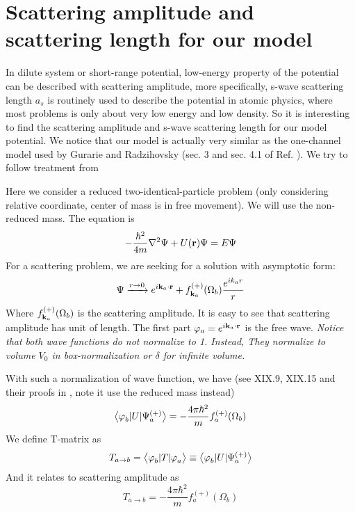 \section{Scattering amplitude and scattering length for our model \label{sec:scatter}}
In dilute system or short-range potential, low-energy property of the potential can be described with scattering amplitude\cite{Pethick,Fetter}, more specifically, s-wave scattering length $a_{s}$ is routinely used to describe the potential in atomic physics, where most problems is only about very low energy and low density.  So it is interesting to find the scattering amplitude and s-wave scattering length for our model potential. We notice that our model is actually very similar as the one-channel model used by Gurarie and Radzihovsky (sec. 3 and sec. 4.1 of Ref. \cite{GurarieNarrow}).  We try to follow treatment from \cite{Messiah,GurarieNarrow}

Here we consider a reduced two-identical-particle problem (only considering relative coordinate, center of mass is in free movement).  We will use the non-reduced mass.  The \sch equation is 
\begin{equation}
-\frac{\hbar^{2}}{4m}\nabla^{2}\Psi+U(\mathbf{r})\Psi=E\Psi
\end{equation}
For a scattering problem, we are seeking for a solution with asymptotic form:
\begin{equation}
\Psi\xrightarrow{r\rightarrow0}e^{i\mathbf{k}_{a}\cdot\mathbf{r}}+f_{\mathbf{k}_{a}}^{(+)}(\Omega_{b})\frac{e^{ik_{a}r}}{r}
\end{equation}
Where $f_{\mathbf{k}_{a}}^{(+)}(\Omega_{b})$ is the scattering amplitude.  It is easy to see that scattering amplitude has unit of length.  The first part $\varphi_{a}=e^{i\mathbf{k}_{a}\cdot\mathbf{r}}$ is the free wave.  \emph{Notice that both wave functions  do not normalize to 1.  Instead, They normalize to volume $V_{0}$ in box-normalization or $\delta$ for infinite volume.}

With such a normalization of wave function, we have (see XIX.9, XIX.15 and their proofs in \cite{Messiah}, note it use the reduced mass instead)
\begin{equation}
\bigl<{\varphi_{b}^{}{\lvert{U}\rvert}\Psi_{a}^{(+)}}\bigr>=-\frac{4\pi\hbar^{2}}{m}f_{a}^{(+)}(\Omega_{b})
\end{equation}
We define  T-matrix  as 
\begin{equation}
T_{a\rightarrow{b}}=\bigl<{\varphi_{b}^{}{\lvert{T}\rvert}\varphi_{a}^{}}\bigr>\equiv\bigl<{\varphi_{b}^{}{\lvert{U}\rvert}\Psi_{a}^{(+)}}\bigr>
\end{equation}
And it relates to scattering amplitude as 
\begin{equation}
T_{a\rightarrow{b}}=-\frac{4\pi\hbar^{2}}{m}f_{a}^{(+)}(\Omega_{b})
\end{equation}

